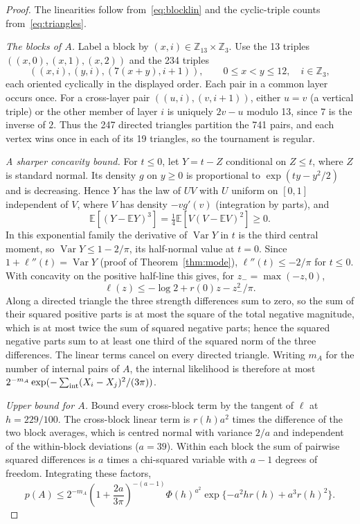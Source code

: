 \documentclass[11pt,a4paper]{article}
\theoremstyle{definition}
\newcommand{\E}{\mathbb E}
\begin{document}
\begin{proof}
The linearities follow from~\eqref{eq:blocklin} and the cyclic-triple counts from~\eqref{eq:triangles}.

\emph{The blocks of $A$.} Label a block by $(x,i)\in\mathbb Z_{13}\times\mathbb Z_3$. Use the 13 triples $((x,0),(x,1),(x,2))$ and the 234 triples
\[
 ((x,i),(y,i),(7(x+y),i+1)),\qquad 0\le x<y\le12,\quad i\in\mathbb Z_3 ,
\]
each oriented cyclically in the displayed order. Each pair in a common layer occurs once. For a cross-layer pair $((u,i),(v,i+1))$, either $u=v$ (a vertical triple) or the other member of layer $i$ is uniquely $2v-u$ modulo 13, since $7$ is the inverse of $2$. Thus the 247 directed triangles partition the 741 pairs, and each vertex wins once in each of its 19 triangles, so the tournament is regular.

\emph{A sharper concavity bound.} For $t\le0$, let $Y=t-Z$ conditional on $Z\le t$, where $Z$ is standard normal. Its density $g$ on $y\ge0$ is proportional to $\exp(ty-y^2/2)$ and is decreasing. Hence $Y$ has the law of $UV$ with $U$ uniform on $[0,1]$ independent of $V$, where $V$ has density $-vg'(v)$ (integration by parts), and
\[
 \E[(Y-\E Y)^3]=\tfrac14\E[V(V-\E V)^2]\ge0 .
\]
In this exponential family the derivative of $\operatorname{Var}Y$ in $t$ is the third central moment, so $\operatorname{Var}Y\le 1-2/\pi$, its half-normal value at $t=0$. Since $1+\ell''(t)=\operatorname{Var}Y$ (proof of Theorem~\ref{thm:mode}), $\ell''(t)\le-2/\pi$ for $t\le0$. With concavity on the positive half-line this gives, for $z_-=\max(-z,0)$,
\[
 \ell(z)\le -\log2+r(0)z-z_-^2/\pi .
\]
Along a directed triangle the three strength differences sum to zero, so the sum of their squared positive parts is at most the square of the total negative magnitude, which is at most twice the sum of squared negative parts; hence the squared negative parts sum to at least one third of the squared norm of the three differences. The linear terms cancel on every directed triangle. Writing $m_A$ for the number of internal pairs of $A$, the internal likelihood is therefore at most $2^{-m_A}\exp(-\sum_{\rm int}(X_i-X_j)^2/(3\pi))$.

\emph{Upper bound for $A$.} Bound every cross-block term by the tangent of $\ell$ at $h=229/100$. The cross-block linear term is $r(h)a^2$ times the difference of the two block averages, which is centred normal with variance $2/a$ and independent of the within-block deviations ($a=39$). Within each block the sum of pairwise squared differences is $a$ times a chi-squared variable with $a-1$ degrees of freedom. Integrating these factors,
\begin{equation}\label{eq:upper78}
 p(A)\le 2^{-m_A}\left(1+\frac{2a}{3\pi}\right)^{-(a-1)}
             \Phi(h)^{a^2}\exp\{-a^2h r(h)+a^3r(h)^2\}.
\end{equation}


\end{proof}
\end{document}
